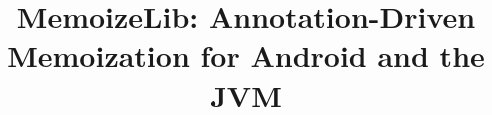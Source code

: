 \documentclass[sigconf,nonacm]{acmart}[print]
\begin{document}
\title{MemoizeLib: Annotation-Driven Memoization for Android and the JVM}





\maketitle








\end{document}
